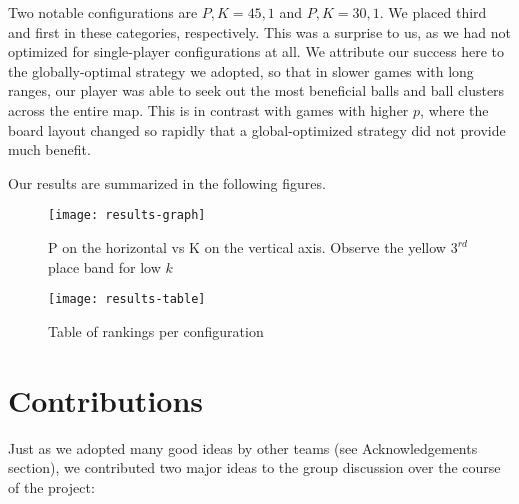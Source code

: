 \documentclass[
10pt, %
letterpaper, %
oneside, %
headinclude,footinclude, %
english
]{article}
\begin{document}
Two notable configurations are $P,K=45,1$ and $P,K=30,1$. We placed third and first in these categories, respectively. This was a surprise to us, as we had not optimized for single-player configurations at all. We attribute our success here to the globally-optimal strategy we adopted, so that in slower games with long ranges, our player was able to seek out the most beneficial balls and ball clusters across the entire map. This is in contrast with games with higher $p$, where the board layout changed so rapidly that a global-optimized strategy did not provide much benefit.

Our results are summarized in the following figures.

\begin{figure}[h]
\centering
\texttt{[image: results-graph]}
\caption[Group 5 tournament results as a function of P and K]{P on the horizontal vs K on the vertical axis. Observe the yellow $3^{rd}$ place band for low $k$}
\label{fig:gallery2}
\end{figure}

\begin{figure}[h]
\centering
\texttt{[image: results-table]}
\caption[Table of rankings per configuration]{Table of rankings per configuration}
\label{fig:gallery2}
\end{figure}

\section{Contributions}

Just as we adopted many good ideas by other teams (see Acknowledgements section), we contributed two major ideas to the group discussion over the course of the project:
\end{document}
